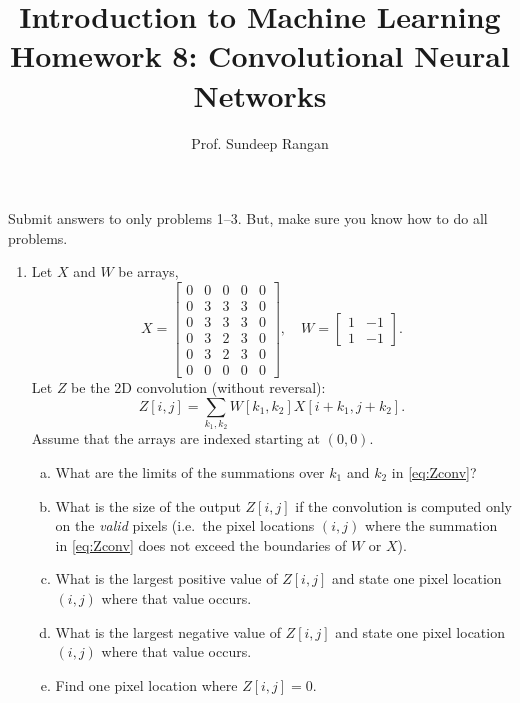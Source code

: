 \documentclass[11pt]{article}
\def\beq{\begin{equation}}
\def\eeq{\end{equation}}
\begin{document}
\title{Introduction to Machine Learning\\
Homework 8:  Convolutional Neural Networks}
\author{Prof. Sundeep Rangan}
\date{}

\maketitle

Submit answers to only problems 1--3.  But, make sure you know how to do all problems.

\begin{enumerate}

\item Let $X$ and $W$ be arrays,
\[
    X = \left[ \begin{array}{ccccc}
        0 & 0 & 0 & 0 & 0 \\
        0 & 3 & 3 & 3 & 0 \\
        0 & 3 & 3 & 3 & 0 \\
        0 & 3 & 2 & 3 & 0 \\
        0 & 3 & 2 & 3 & 0 \\
        0 & 0 & 0 & 0 & 0
        \end{array} \right], \quad
    W = \left[ \begin{array}{cc}
        1 & -1 \\
        1 & -1
        \end{array} \right].
\]
Let $Z$ be the 2D convolution (without reversal):
\beq \label{eq:Zconv}
    Z[i,j] = \sum_{k_1,k_2} W[k_1,k_2]X[i+k_1,j+k_2].
\eeq
Assume that the arrays are indexed starting at $(0,0)$.
\begin{enumerate}[(a)]
\item What are the limits of the summations over $k_1$ and $k_2$ in \eqref{eq:Zconv}?
\item What is the size of the output $Z[i,j]$ if the convolution is computed only on the \emph{valid} pixels (i.e.\ the pixel locations $(i,j)$
where the summation in \eqref{eq:Zconv} does not exceed the boundaries of $W$ or $X$).
\item What is the largest positive value of $Z[i,j]$ and state one pixel location $(i,j)$ where that value occurs.
\item What is the largest negative value of $Z[i,j]$ and state one pixel location $(i,j)$ where that value occurs.
\item Find one pixel location where $Z[i,j]=0$.
\end{enumerate}


\end{enumerate}
\end{document}

